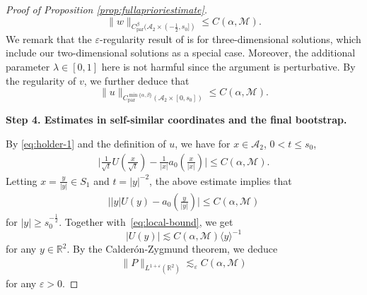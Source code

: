\documentclass[12pt,reqno]{amsart}
\theoremstyle{plain}
\theoremstyle{definition}
\newcommand{\R}{\mathbb{R}}
\newcommand{\M}{\mathcal{M}}
\newcommand{\A}{\mathcal{A}}
\renewcommand{\:}{\colon}
\numberwithin{equation}{section}
\numberwithin{figure}{section}
\begin{document}
\begin{proof}[Proof of Proposition \ref{prop:fullaprioriestimate}]
\begin{equation}
    \|w\|_{C_{\text{par}}^\beta(\A_{2} \times (-\frac12, s_0])} \le C(\alpha, \M).
\end{equation}
We remark that the $\varepsilon$-regularity result of \cite{jiasverakselfsim} is for three-dimensional solutions, which include our two-dimensional solutions as a special case. Moreover, the additional parameter $\lambda \in [0,1]$ here is not harmful since the argument is perturbative.  By the regularity of $v$, we further deduce that
 \begin{equation} \label{eq:holder-1}
    \|u\|_{C_{\text{par}}^{\min\{\alpha,\beta\}}(\A_{2} \times [0, s_0])} \le C(\alpha, \M).
\end{equation}



\smallskip
\textbf{Step 4. Estimates in self-similar coordinates and the final bootstrap.}
\smallskip


By \eqref{eq:holder-1} and the definition of $u$, we have for $x \in \A_{2}$, $0 < t \le s_0$,
\begin{align}
   \biggl| \frac{1}{\sqrt{t}} U\left(\frac{x}{\sqrt{t}}\right) - \frac{1}{|x|} a_0\left(\frac{x}{|x|}\right)\biggr| \le C(\alpha, \M).
\end{align}
Letting $x = \frac{y}{|y|} \in S_1$ and $t = |y|^{-2}$, the above estimate implies that
\begin{align}
     \biggl| |y| U(y) -  a_0\left(\frac{y}{|y|}\right) \biggr| \le C(\alpha, \M) 
\end{align}
for $|y| \ge s_0^{-\frac12}$. Together with~\eqref{eq:local-bound}, we get
\begin{equation}\label{eq-cor-1}
    \bigl|U(y)\bigr| \lesssim C(\alpha, \M) \langle y \rangle^{-1} 
\end{equation}
for any $y \in \R^2$. By the Calder\'on-Zygmund theorem, we deduce
\begin{eqnarray}
    \|P\|_{L^{1+\varepsilon}(\R^2)} \lesssim_{\varepsilon} C( \alpha, \M)
\end{eqnarray}
for any $\varepsilon>0$.


\end{proof}
\end{document}
